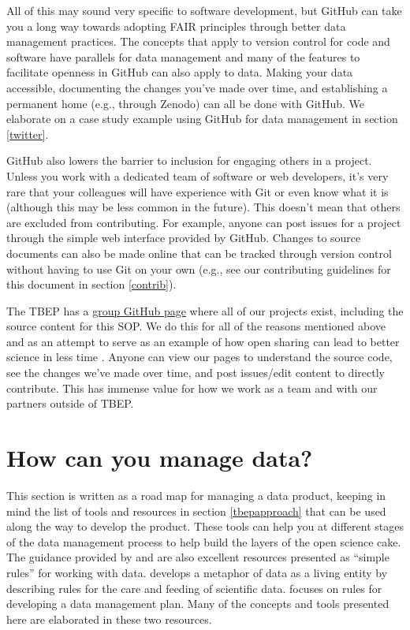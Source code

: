 \documentclass[
]{book}
\begin{document}
All of this may sound very specific to software development, but GitHub can take you a long way towards adopting FAIR principles through better data management practices. The concepts that apply to version control for code and software have parallels for data management and many of the features to facilitate openness in GitHub can also apply to data. Making your data accessible, documenting the changes you've made over time, and establishing a permanent home (e.g., through Zenodo) can all be done with GitHub. We elaborate on a case study example using GitHub for data management in section \ref{twitter}.

GitHub also lowers the barrier to inclusion for engaging others in a project. Unless you work with a dedicated team of software or web developers, it's very rare that your colleagues will have experience with Git or even know what it is (although this may be less common in the future). This doesn't mean that others are excluded from contributing. For example, anyone can post issues for a project through the simple web interface provided by GitHub. Changes to source documents can also be made online that can be tracked through version control without having to use Git on your own (e.g., see our contributing guidelines for this document in section \ref{contrib}).

The TBEP has a \href{https://github.com/tbep-tech}{group GitHub page} where all of our projects exist, including the source content for this SOP. We do this for all of the reasons mentioned above and as an attempt to serve as an example of how open sharing can lead to better science in less time \citep{Lowndes17}. Anyone can view our pages to understand the source code, see the changes we've made over time, and post issues/edit content to directly contribute. This has immense value for how we work as a team and with our partners outside of TBEP.

\hypertarget{howyou}{%
\section{How can you manage data?}\label{howyou}}

This section is written as a road map for managing a data product, keeping in mind the list of tools and resources in section \ref{tbepapproach} that can be used along the way to develop the product. These tools can help you at different stages of the data management process to help build the layers of the open science cake. The guidance provided by \citet{Goodman14} and \citet{Michener15} are also excellent resources presented as ``simple rules'' for working with data. \citet{Goodman14} develops a metaphor of data as a living entity by describing rules for the care and feeding of scientific data. \citet{Michener15} focuses on rules for developing a data management plan. Many of the concepts and tools presented here are elaborated in these two resources.
\end{document}

